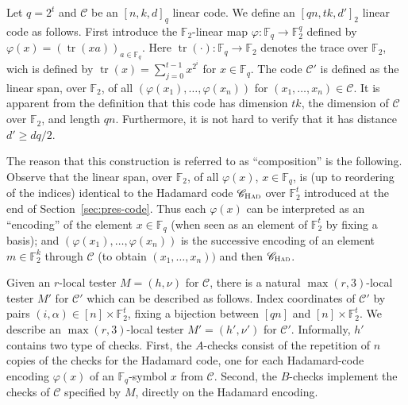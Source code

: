 \documentclass[11pt]{article}
\theoremstyle{definition}
\newcommand{\code}{\mathscr{C}}
\newcommand{\F}{\ensuremath{\mathbb{F}}}
\newcommand{\Had}{\ensuremath{\textsc{Had}}}
\DeclareMathOperator{\tr}{tr}
\begin{document}

Let $q=2^t$ and $\code$ be an $[n,k,d]_q$ linear code. We define an $[qn,tk,d']_2$ linear code as follows. First introduce the $\F_2$-linear map $\varphi:\F_q\to\F_2^q$ defined by $\varphi(x)=(\tr(xa))_{a\in \F_q}$. Here  $\tr(\cdot):\F_q\to\F_2$ denotes the trace over $\F_2$, wich is defined by $\tr(x) = \sum_{j=0}^{t-1} x^{2^i}$ for $x\in \F_q$. The code $\code'$ is defined as the linear span, over $\F_2$, of all $(\varphi(x_1),\ldots,\varphi(x_n))$ for $(x_1,\ldots,x_n)\in \code$. It is apparent from the definition that this code has dimension $tk$, the dimension of $\code$ over $\F_2$, and length $qn$. Furthermore, it is not hard to verify that it has distance $d'\geq dq/2$.

The reason that this construction is referred to as ``composition'' is the following. Observe that the linear span, over $\F_2$, of all $\varphi(x)$, $x\in \F_q$, is (up to reordering of the indices) identical to the Hadamard code $\code_\Had$ over $\F_2^t$ introduced at the end of Section~\ref{sec:pres-code}. Thus each $\varphi(x)$ can be interpreted as an ``encoding'' of the element $x\in \F_q$ (when seen as an element of $\F_2^t$ by fixing a basis); and  $(\varphi(x_1),\ldots,\varphi(x_n))$ is the successive encoding of an element $m\in\F_2^k$ through $\code$ (to obtain $(x_1,\ldots,x_n))$ and then $\code_\Had$.


%

Given an $r$-local tester $M=(h,\nu)$ for $\code$, there is a natural $\max(r,3)$-local tester $M'$ for $\code'$ which can be described as follows. Index coordinates of $\code'$ by pairs $(i,\alpha)\in [n]\times\F_2^t$, fixing a bijection between $[qn]$ and $[n]\times \F_2^t$.  We describe an $\max(r,3)$-local tester $M' = (h',\nu')$ for $\code'$. Informally, $h'$ contains two type of checks. First, the $A$-checks consist of the repetition of $n$ copies of the checks for the Hadamard code, one for each Hadamard-code encoding $\varphi(x)$ of an $\F_q$-symbol $x$ from $\code$. Second, the $B$-checks implement the checks of $\code$ specified by $M$, directly on the Hadamard encoding. 
\end{document}
